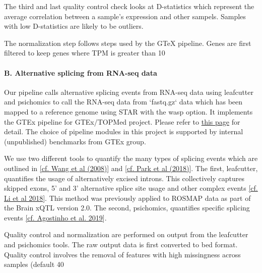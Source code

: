 \documentclass[12pt]{article}
\begin{document}
The third and last quality control check looks at D-statistics which represent the average correlation between a sample's expression and other sampels. Samples with low D-statistics are likely to be outliers.









The normalization step follows steps used by the GTeX pipeline. Genes are first filtered to keep genes where TPM is greater than 10%




\paragraph*{B.  Alternative splicing from RNA-seq data}


Our pipeline calls alternative splicing events from RNA-seq data using leafcutter and psichomics to call the RNA-seq data from `fastq.gz` data which has been mapped to a reference genome using STAR with the wasp option. It implements the GTEx pipeline for GTEx/TOPMed project. Please refer to \href{https://github.com/broadinstitute/gtex-pipeline/blob/master/TOPMed\\_RNAseq\\_pipeline.md}{this page} for detail. The choice of pipeline modules in this project is supported by internal (unpublished) benchmarks from GTEx group.



We use two different tools to quantify the many types of splicing events which are outlined in \href{https://doi.org/10.1038/nature07509}{[cf. Wang et al (2008)}] and \href{https://doi.org/10.1016/j.ajhg.2017.11.002}{[cf. Park et al (2018)}]. The first, leafcutter, quantifies the usage of alternatively excised introns. This collectively captures skipped exons, 5’ and 3’ alternative splice site usage and other complex events \href{https://doi.org/10.1038/s41588-017-0004-9}{[cf. Li et al 2018}]. This method was previously applied to ROSMAP data as part of the Brain xQTL version 2.0.  The second, psichomics, quantifies specific splicing events \href{https://doi.org/10.1093/nar/gky888}{[cf. Agostinho et al. 2019}].


Quality control and normalization are performed on output from the leafcutter and psichomics tools. The raw output data is first converted to bed format. Quality control involves the removal of features with high missingness across samples (default 40%
\end{document}
